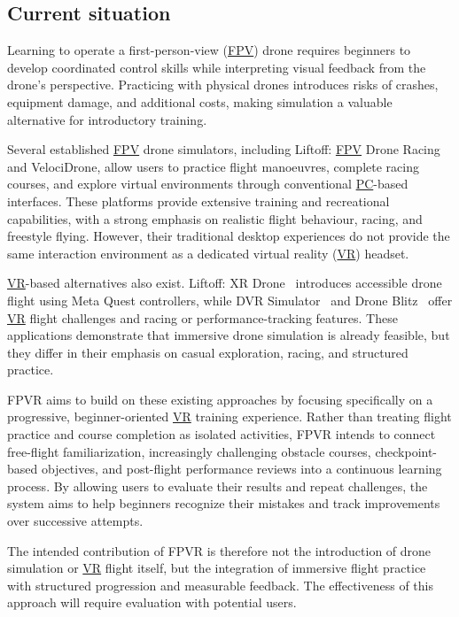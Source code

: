 \documentclass[12pt]{article}
\begin{document}
\subsection{Current situation}\label{g2}

Learning to operate a first-person-view (\hyperlink{glos:FPV}{FPV}) drone requires beginners to develop coordinated control skills while interpreting visual feedback from the drone's perspective. Practicing with physical drones introduces risks of crashes, equipment damage, and additional costs, making simulation a valuable alternative for introductory training.

Several established \hyperlink{glos:FPV}{FPV} drone simulators, including Liftoff: \hyperlink{glos:FPV}{FPV} Drone Racing~\cite{liftoffFPV}  and VelociDrone\cite{velocidrone}, allow users to practice flight manoeuvres, complete racing courses, and explore virtual environments through conventional \hyperlink{glos:PCVR}{PC}-based interfaces. These platforms provide extensive training and recreational capabilities, with a strong emphasis on realistic flight behaviour, racing, and freestyle flying. However, their traditional desktop experiences do not provide the same interaction environment as a dedicated virtual reality (\hyperlink{glos:VR}{VR}) headset.

\hyperlink{glos:VR}{VR}-based alternatives also exist. Liftoff: XR Drone~\cite{liftoffXR} introduces accessible drone flight using Meta Quest controllers, while DVR Simulator~\cite{dvrSimulator} and Drone Blitz~\cite{droneBlitz} offer \hyperlink{glos:VR}{VR} flight challenges and racing or performance-tracking features. These applications demonstrate that immersive drone simulation is already feasible, but they differ in their emphasis on casual exploration, racing, and structured practice.

FPVR aims to build on these existing approaches by focusing specifically on a progressive, beginner-oriented \hyperlink{glos:VR}{VR} training experience. Rather than treating flight practice and course completion as isolated activities, FPVR intends to connect free-flight familiarization, increasingly challenging obstacle courses, checkpoint-based objectives, and post-flight performance reviews into a continuous learning process. By allowing users to evaluate their results and repeat challenges, the system aims to help beginners recognize their mistakes and track improvements over successive attempts.

The intended contribution of FPVR is therefore not the introduction of drone simulation or \hyperlink{glos:VR}{VR} flight itself, but the integration of immersive flight practice with structured progression and measurable feedback. The effectiveness of this approach will require evaluation with potential users.
\end{document}
